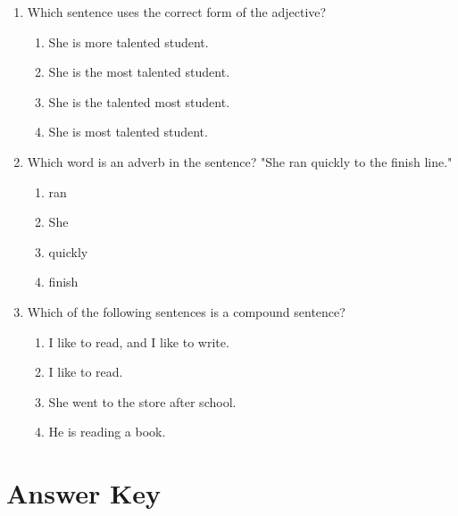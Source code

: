 \documentclass[12pt]{article}
\begin{document}
\begin{enumerate}
    \item Which sentence uses the correct form of the adjective?  
    \begin{enumerate}[label=\Alph*.]
        \item She is more talented student.
        \item She is the most talented student.
        \item She is the talented most student.
        \item She is most talented student.
    \end{enumerate}
    \vspace{0.5cm}

    \item Which word is an adverb in the sentence? "She ran  quickly to the finish line."  
    \begin{enumerate}[label=\Alph*.]
        \item ran
        \item She
        \item quickly
        \item finish
    \end{enumerate}
    \vspace{0.5cm}

    \item Which of the following sentences is a compound sentence?  
    \begin{enumerate}[label=\Alph*.]
        \item I like to read, and I like to write.
        \item I like to read.
        \item She went to the store after school.
        \item He is reading a book.
    \end{enumerate}

\end{enumerate}

\newpage
\section*{Answer Key}
\end{document}
